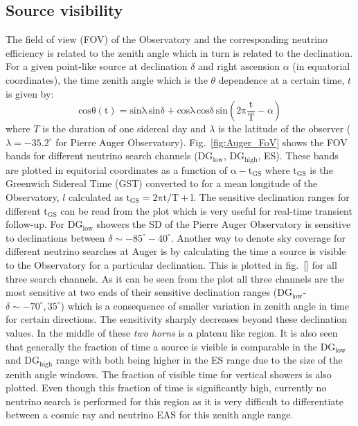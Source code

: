 \subsection{Source visibility}
\label{subsec:psource_coverage}
The field of view (FOV) of the Observatory and the corresponding neutrino efficiency is related to the zenith angle which in turn is related to the declination. For a given point-like source at declination $\delta$ and right ascension $\alpha$ (in equatorial coordinates), the time zenith angle which is the $\theta$ dependence at a certain time, $t$ is given by:
\begin{equation}
  \label{eq:zenith_angle_time}
  \mathrm{cos \theta(t) = sin \lambda \,sin \delta+ cos \lambda \, cos \delta \,sin (2\pi \frac{t}{T} - \alpha)}
\end{equation} 
where $T$ is the duration of one sidereal day and $\lambda$ is the latitude of the observer ($\lambda = -35.2^{\circ}$ for Pierre Auger Observatory). 
Fig.~\ref{fig:Auger_FoV} shows the FOV bands for different neutrino search channels (DG$\mathrm{_{low}}$, DG$\mathrm{_{high}}$, ES). These bands are plotted in equitorial coordinates as a function of $\mathrm{\alpha - t _{GS}}$ where $\mathrm{t_{GS}}$ is the Greenwich Sidereal Time (GST) converted to for a mean longitude of the Observatory, $l$ calculated as $\mathrm{t_{GS}= 2\pi t/T + l}$. The sensitive declination ranges for different $\mathrm{t_{GS}}$ can be read from the plot which is very useful for real-time transient follow-up. For DG$\mathrm{_{low}}$ showers the SD of the Pierre Auger Observatory is sensitive to declinations between $\delta \sim -85^{\circ} - 40^{\circ}$. Another way to denote sky coverage for different neutrino searches at Auger is by calculating the time a source is visible to the Observatory for a particular declination. This is plotted in fig.~\ref{} for all three search channels. As it can be seen from the plot all three channels are the most sensitive at two ends of their sensitive declination ranges (DG$\mathrm{_{low}}$-$\delta \sim -70^{\circ}, 35^{\circ}$) which is a consequence of smaller variation in zenith angle in time for certain directions. The sensitivity sharply decreases beyond these declination values. In the middle of these \textit{two horns} is a plateau like region. It is also seen that generally the fraction of time a source is visible is comparable in the DG$\mathrm{_{low}}$ and DG$\mathrm{_{high}}$ range with both being higher in the ES range due to the size of the zenith angle windows. The fraction of visible time for vertical showers is also plotted. Even though this fraction of time is significantly high, currently no neutrino search is performed for this region as it is very difficult to differentiate between a cosmic ray and neutrino EAS for this zenith angle range.

